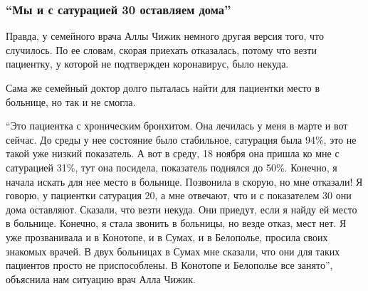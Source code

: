  
 
 

\subsubsection{\enquote{Мы и с сатурацией 30 оставляем дома}}

Правда, у семейного врача Аллы Чижик немного другая версия того, что случилось. По ее словам, скорая приехать отказалась, потому что везти пациентку, у которой не подтвержден коронавирус, было некуда.

Сама же семейный доктор долго пыталась найти для пациентки место в больнице, но так и не смогла.

\enquote{Это пациентка с хроническим бронхитом. Она лечилась у меня в марте и вот
сейчас. До среды у нее состояние было стабильное, сатурация была 94\%, это не
такой уже низкий показатель. А вот в среду, 18 ноября она пришла ко мне с
сатурацией 31\%, тут она посидела, показатель поднялся до 50\%. Конечно, я
начала искать для нее место в больнице. Позвонила в скорую, но мне отказали! Я
говорю, у пациентки сатурация 20, а мне отвечают, что и с показателем 30 они
дома оставляют. Сказали, что везти некуда. Они приедут, если я найду ей место в
больнице. Конечно, я стала звонить в больницы, но везде отказ, мест нет. Я уже
прозванивала и в Конотопе, и в Сумах, и в Белополье, просила своих знакомых
врачей. В двух больницах в Сумах мне сказали, что они для таких пациентов
просто не приспособлены. В Конотопе и Белополье \dshM все занято}, \dshM объяснила нам
ситуацию врач Алла Чижик.
